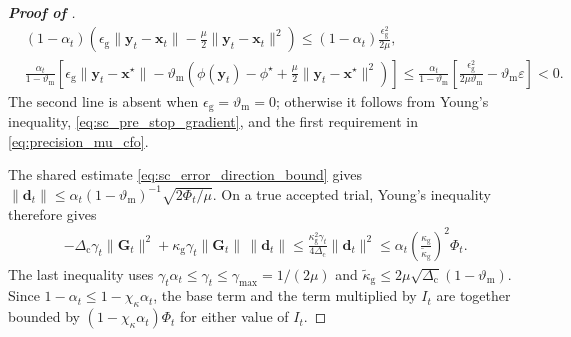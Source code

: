 \documentclass{article}
\begin{document}
\begin{proof}[\textbf{Proof of }]
\[\begin{aligned}
&(1-\alpha_t)
\left(
\epsilon_{\mathrm{g}}\|\bm{y}_t-\bm{x}_t\|
-\frac\mu2\|\bm{y}_t-\bm{x}_t\|^2
\right)
\le
(1-\alpha_t)\frac{\epsilon_{\mathrm{g}}^2}{2\mu},\\
&\frac{\alpha_t}{1-\vartheta_{\mathrm{m}}}
\left[
\epsilon_{\mathrm{g}}\|\bm{y}_t-\bm{x}^\star\|
-\vartheta_{\mathrm{m}}
\left(
\phi(\bm{y}_t)-\phi^\star
+\frac\mu2\|\bm{y}_t-\bm{x}^\star\|^2
\right)
\right]\le
\frac{\alpha_t}{1-\vartheta_{\mathrm{m}}}
\left[
\frac{\epsilon_{\mathrm{g}}^2}{2\mu\vartheta_{\mathrm{m}}}
-\vartheta_{\mathrm{m}}\varepsilon
\right]<0.
\end{aligned}
\]
The second line is absent when \(\epsilon_{\mathrm{g}}=\vartheta_{\mathrm{m}}=0\);
otherwise it follows from Young's inequality,
\eqref{eq:sc_pre_stop_gradient}, and
the first requirement in \eqref{eq:precision_mu_cfo}.

The shared estimate \eqref{eq:sc_error_direction_bound} gives
\(\|\bm{d}_t\|\le\alpha_t(1-\vartheta_{\mathrm{m}})^{-1}
\sqrt{2\Phi_t/\mu}\).
On a true accepted trial, Young's inequality therefore gives
\[
\begin{aligned}
&-\Delta_{\mathrm{c}}\gamma_t\|\mathbf{G}_t\|^2
+\kappa_{\mathrm{g}}\gamma_t\|\mathbf{G}_t\|\,\|\bm{d}_t\|\le
\frac{\kappa_{\mathrm{g}}^2\gamma_t}{4\Delta_{\mathrm{c}}}\|\bm{d}_t\|^2
\le
\alpha_t
\left(\frac{\kappa_{\mathrm{g}}}{\widetilde\kappa_{\mathrm{g}}}\right)^2
\Phi_t.
\end{aligned}
\]
The last inequality uses
\(\gamma_t\alpha_t\le\gamma_t\le\gamma_{\max}=1/(2\mu)\) and
\(\widetilde\kappa_{\mathrm{g}}
\le2\mu\sqrt{\Delta_{\mathrm{c}}}(1-\vartheta_{\mathrm{m}})\).
Since \(1-\alpha_t\le1-\chi_\kappa\alpha_t\), the base term and the
term multiplied by \(I_t\) are together bounded by
\((1-\chi_\kappa\alpha_t)\Phi_t\) for either value of \(I_t\).


\end{proof}
\end{document}
